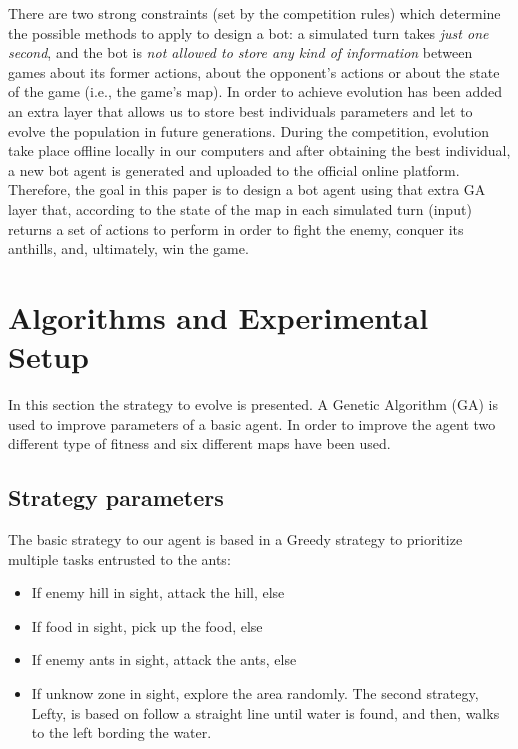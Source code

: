 \documentclass[runningheads]{llncs}
\begin{document}
There are two strong constraints (set by the competition rules) which determine the possible methods to apply to design a bot: a simulated turn takes \textit{just one second}, and the bot is \textit{not allowed to store any kind of information} between games about its former actions, about the opponent's actions or about the state of the game (i.e., the game's map). In order to achieve evolution has been added an extra layer that allows us to store best individuals parameters and let to evolve the population in future generations. During the competition, evolution take place offline locally in our computers and after obtaining the best individual, a new bot agent is generated and uploaded to the official online platform.
Therefore, the goal in this paper is to design a bot agent using that extra GA layer that, according to the state of the map in each simulated turn (input) returns a set of actions to perform in order to fight the enemy, conquer its anthills, and, ultimately, win the game. 
\section{Algorithms and Experimental Setup}

In this section the strategy to evolve is presented. A Genetic Algorithm (GA) is used to improve parameters of a basic agent.  In order to improve the agent two different type of fitness and six different maps have been used. %

\subsection{Strategy parameters}
The basic strategy to our agent is based in a Greedy strategy to prioritize multiple tasks entrusted to the ants:
\begin{itemize}
 \item If enemy hill in sight, attack the hill, else
 \item If food in sight, pick up the food, else
 \item If enemy ants in sight, attack the ants, else
 \item If unknow zone in sight, explore the area randomly.
The second strategy, Lefty, is based on follow a straight line until water is found, and then, walks to the left bording the water.

\end{itemize}
\end{document}
